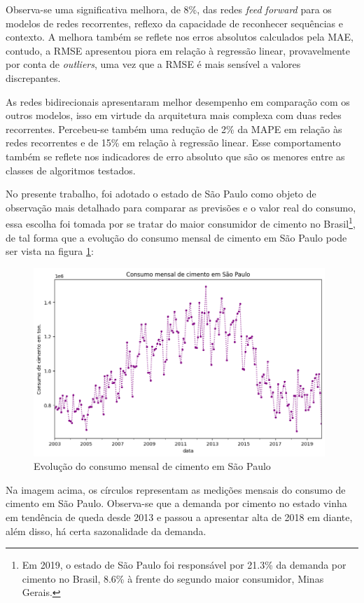 Observa-se uma significativa melhora, de 8\%, das redes \textit{feed forward} para os modelos
de redes recorrentes, reflexo da capacidade de reconhecer sequências e contexto.
A melhora também se reflete nos erros absolutos calculados pela MAE, contudo, a 
RMSE apresentou piora em relação à regressão linear, provavelmente por conta 
de \textit{outliers}, uma vez que a RMSE é mais sensível a valores discrepantes.

As redes bidirecionais apresentaram melhor desempenho em comparação com os outros 
modelos, isso em virtude da arquitetura mais complexa com duas redes recorrentes. Percebeu-se também uma
redução de 2\% da MAPE em relação às redes recorrentes e de 15\% em relação à 
regressão linear. Esse comportamento também se reflete nos indicadores de 
erro absoluto que são os menores entre as classes de algoritmos testados.

No presente trabalho, foi adotado o estado de São Paulo como objeto de observação mais detalhado para comparar as previsões e o valor real 
do consumo, essa escolha foi tomada por 
se tratar do maior consumidor de cimento no Brasil\footnote{Em 2019, o estado 
de São Paulo foi 
responsável por 21.3\% da demanda por cimento no Brasil, 8.6\% à frente do 
segundo maior consumidor, Minas Gerais.}, de tal forma que a evolução do consumo 
mensal de cimento em São Paulo pode ser vista na figura \ref{consumo-sp}:

\begin{figure}[H]
    \centering
    \includegraphics[width=11cm]{../figuras/graficos/evolucao-consumo-sp.png}
    \caption{Evolução do consumo mensal de cimento em São Paulo}
    \label{consumo-sp}
\end{figure}

Na imagem acima, os círculos representam as medições mensais do consumo de 
cimento em São Paulo. Observa-se que a demanda por cimento no estado vinha em tendência
de queda desde 2013 e passou a apresentar alta de 2018 em diante, além disso, há certa
sazonalidade da demanda.

